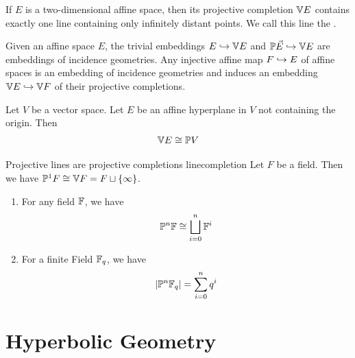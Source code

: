 \begin{exercise}
	If $E$ is a two-dimensional affine space, then its projective completion $\mathbb{V} E$ contains exactly one line containing only infinitely distant points. We call this line the .
\end{exercise}
\begin{exercise}
	Given an affine space $E$, the trivial embeddings $E \hookrightarrow \mathbb{V} E$ and $\mathbb{P} \vec{E} \hookrightarrow \mathbb{V} E$ are embeddings of incidence geometries. Any injective affine map $F \hookrightarrow E$ of affine spaces is an embedding of incidence geometries and induces an embedding $\mathbb{V} E \hookrightarrow \mathbb{V} F$ of their projective completions.
\end{exercise}
\begin{importanttheorem}{}{}
	Let $V$ be a vector space. Let $E$ be an affine hyperplane in $V$ not containing the origin. Then 
	\begin{align*}
		\mathbb{V} E \cong \mathbb{P} V
	\end{align*}
\end{importanttheorem}
\begin{importantcorollary}{Projective lines are projective completions }{linecompletion}
	Let $F$ be a field. Then we have $\mathbb{P}^1 F \cong \mathbb{V} F = F \sqcup \qty{\infty}$.
\end{importantcorollary}
\begin{exercise}
	\begin{enumerate}
		\item For any field $\mathbb{F}$, we have
		\begin{align*}
			\mathbb{P}^n \mathbb{F} \cong \bigsqcup_{i = 0}^n \mathbb{F}^i
		\end{align*}
		\item For a finite Field $\mathbb{F}_q$, we have
		\begin{align*}
			\abs{\mathbb{P}^n \mathbb{F}_q} =
			\sum_{i = 0}^n q^{i}
		\end{align*}
	\end{enumerate}
\end{exercise}
\chapter{Hyperbolic Geometry}
